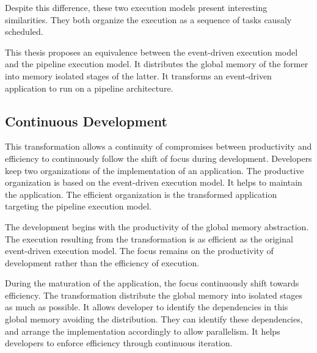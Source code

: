 Despite this difference, these two execution models present interesting similarities.
They both organize the execution as a sequence of tasks causaly scheduled. %

This thesis proposes an equivalence between the event-driven execution model and the pipeline execution model.
It distributes the global memory of the former into memory isolated stages of the latter.
It transforms an event-driven application to run on a pipeline architecture.

\subsection{Continuous Development}

This transformation allows a continuity of compromises between productivity and efficiency to continuously follow the shift of focus during development.
Developers keep two organizations of the implementation of an application. %
The productive organization is based on the event-driven execution model.
It helps to maintain the application.
The efficient organization is the transformed application targeting the pipeline execution model.

The development begins with the productivity of the global memory abstraction.
The execution resulting from the transformation is as efficient as the original event-driven execution model.
The focus remains on the productivity of development rather than the efficiency of execution.

During the maturation of the application, the focus continuously shift towards efficiency.
The transformation distribute the global memory into isolated stages as much as possible.
It allows developer to identify the dependencies in this global memory avoiding the distribution.
They can identify these dependencies, and arrange the implementation accordingly to allow parallelism.
It helps developers to enforce efficiency through continuous iteration.

